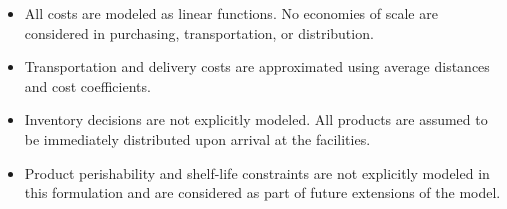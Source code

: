 \documentclass[12pt]{article}
\begin{document}
\begin{itemize}
    \item All costs are modeled as linear functions. No economies of scale are considered in purchasing, transportation, or distribution.
    
    \item Transportation and delivery costs are approximated using average distances and cost coefficients.
    
    
    
    \item Inventory decisions are not explicitly modeled. All products are assumed to be immediately distributed upon arrival at the facilities.
    
    \item Product perishability and shelf-life constraints are not explicitly modeled in this formulation and are considered as part of future extensions of the model.
    
\end{itemize}

\newpage

\newpage
\end{document}

